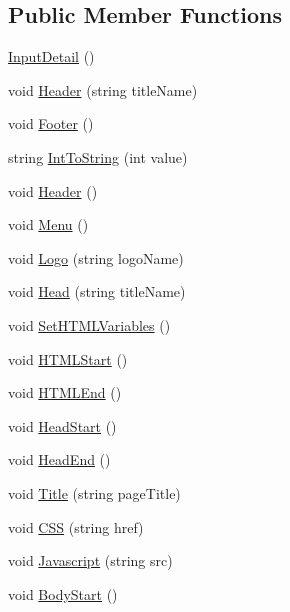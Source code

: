 \subsection*{Public Member Functions}
\begin{DoxyCompactItemize}
\item 
\hyperlink{classInputDetail_ab53655b14d922eb32b5d5d06c702e497}{Input\-Detail} ()
\item 
void \hyperlink{classInputDetail_ae55dcc0e15b85d302a09046b145330bb}{Header} (string title\-Name)
\item 
void \hyperlink{classInputDetail_acbc05b1bc6a371cf0a52222cc95e467d}{Footer} ()
\item 
string \hyperlink{classInputDetail_ad0a78d7c864bcccf7813a526d59573be}{Int\-To\-String} (int value)
\item 
void \hyperlink{classPageLayout_a7726061f0653245f644a05807fa92472}{Header} ()
\item 
void \hyperlink{classPageLayout_a49af1dca286bbee9432192a7b3c00332}{Menu} ()
\item 
void \hyperlink{classPageLayout_ae60235c6af48e3ebbc6343d02456da0c}{Logo} (string logo\-Name)
\item 
void \hyperlink{classPageLayout_ae50907d56f0ba7a85f7ccfdeafa45bcc}{Head} (string title\-Name)
\item 
void \hyperlink{classPageStructureMaker_aaf78d67380c400cc0057c6519276f721}{Set\-H\-T\-M\-L\-Variables} ()
\item 
void \hyperlink{classPageStructureMaker_ad25d6abc983253567e2370882fc1b407}{H\-T\-M\-L\-Start} ()
\item 
void \hyperlink{classPageStructureMaker_a63b877af1c2c8de8332e3f7eb4c2c2b0}{H\-T\-M\-L\-End} ()
\item 
void \hyperlink{classPageStructureMaker_a14312134cb108f91f2e6d9cbd6916e97}{Head\-Start} ()
\item 
void \hyperlink{classPageStructureMaker_ad64115d592b0989b422a93f85278186e}{Head\-End} ()
\item 
void \hyperlink{classPageStructureMaker_a81e902ddc0c0287df1ba0f614a3774d6}{Title} (string page\-Title)
\item 
void \hyperlink{classPageStructureMaker_aacdb11817f8ab246bc59c552e04e862d}{C\-S\-S} (string href)
\item 
void \hyperlink{classPageStructureMaker_ac221d1169f4dbcef6adb00938919193d}{Javascript} (string src)
\item 
void \hyperlink{classPageStructureMaker_ab7a645675166f34fac99f1ed8feb7c27}{Body\-Start} ()

\end{DoxyCompactItemize}
